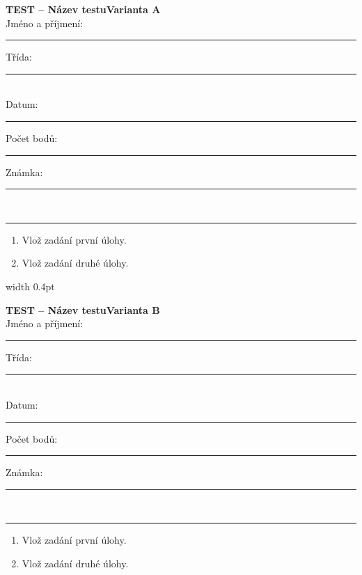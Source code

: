 \documentclass[a4paper,10pt,landscape]{article}
\newcommand{\TestTitle}{Název testu}
\newcommand{\TestHeader}[1]{%
    {\bfseries TEST -- \TestTitle}\hfill{\bfseries Varianta #1}\\[2mm]
    Jméno a příjmení: \rule{4.5cm}{0.4pt}\hfill Třída: \rule{1.5cm}{0.4pt}\\[2mm]
    Datum: \rule{2.4cm}{0.4pt}\hfill Počet bodů: \rule{1.4cm}{0.4pt}\hfill Známka: \rule{1.4cm}{0.4pt}\\[1mm]
    \hrule\vspace{3mm}
}
\newcommand{\AnswerSpace}[1]{\vspace{#1}}
\begin{document}
\noindent
\begin{minipage}[t]{0.48\textwidth}
    \small
    \TestHeader{A}

    \begin{enumerate}
        \item Vlož zadání první úlohy.
        \AnswerSpace{18mm}
        \item Vlož zadání druhé úlohy.
        \AnswerSpace{18mm}
    \end{enumerate}
\end{minipage}%
\hfill\vrule width 0.4pt\hfill
\begin{minipage}[t]{0.48\textwidth}
    \small
    \TestHeader{B}

    \begin{enumerate}
        \item Vlož zadání první úlohy.
        \AnswerSpace{18mm}
        \item Vlož zadání druhé úlohy.
        \AnswerSpace{18mm}
    \end{enumerate}
\end{minipage}
\end{document}
